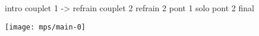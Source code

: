 \documentclass[11pt]{article}
\begin{document}
    \makesongtitle

    intro \rightarrow couplet 1 \rightarrow -> refrain \rightarrow couplet 2
    \rightarrow refrain 2 \rightarrow pont 1 \rightarrow solo \rightarrow pont 2 \rightarrow final
    \begin{center}
        \texttt{[image: mps/main-0]}
    \end{center}
    \newpage
    \begin{multicols}{2}
        
    \end{multicols}
\end{document}
